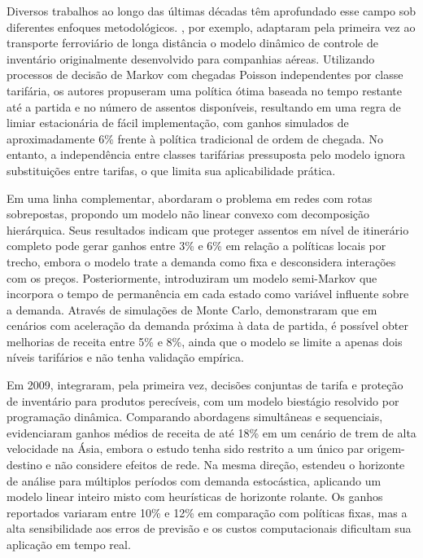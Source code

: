 Diversos trabalhos ao longo das últimas décadas têm aprofundado esse campo sob diferentes enfoques metodológicos. \citet{Feng2001}, por exemplo, adaptaram pela primeira vez ao transporte ferroviário de longa distância o modelo dinâmico de controle de inventário originalmente desenvolvido para companhias aéreas. Utilizando processos de decisão de Markov com chegadas Poisson independentes por classe tarifária, os autores propuseram uma política ótima baseada no tempo restante até a partida e no número de assentos disponíveis, resultando em uma regra de limiar estacionária de fácil implementação, com ganhos simulados de aproximadamente 6\% frente à política tradicional de ordem de chegada. No entanto, a independência entre classes tarifárias pressuposta pelo modelo ignora substituições entre tarifas, o que limita sua aplicabilidade prática.

Em uma linha complementar, \citet{bertsimas2002} abordaram o problema em redes com rotas sobrepostas, propondo um modelo não linear convexo com decomposição hierárquica. Seus resultados indicam que proteger assentos em nível de itinerário completo pode gerar ganhos entre 3\% e 6\% em relação a políticas locais por trecho, embora o modelo trate a demanda como fixa e desconsidera interações com os preços. Posteriormente, \citet{Walczak2007} introduziram um modelo semi-Markov que incorpora o tempo de permanência em cada estado como variável influente sobre a demanda. Através de simulações de Monte Carlo, demonstraram que em cenários com aceleração da demanda próxima à data de partida, é possível obter melhorias de receita entre 5\% e 8\%, ainda que o modelo se limite a apenas dois níveis tarifários e não tenha validação empírica.

Em 2009, \citet{CHEW2009} integraram, pela primeira vez, decisões conjuntas de tarifa e proteção de inventário para produtos perecíveis, com um modelo biestágio resolvido por programação dinâmica. Comparando abordagens simultâneas e sequenciais, evidenciaram ganhos médios de receita de até 18\% em um cenário de trem de alta velocidade na Ásia, embora o estudo tenha sido restrito a um único par origem-destino e não considere efeitos de rede. Na mesma direção, \citet{Cizaire2011} estendeu o horizonte de análise para múltiplos períodos com demanda estocástica, aplicando um modelo linear inteiro misto com heurísticas de horizonte rolante. Os ganhos reportados variaram entre 10\% e 12\% em comparação com políticas fixas, mas a alta sensibilidade aos erros de previsão e os custos computacionais dificultam sua aplicação em tempo real.

